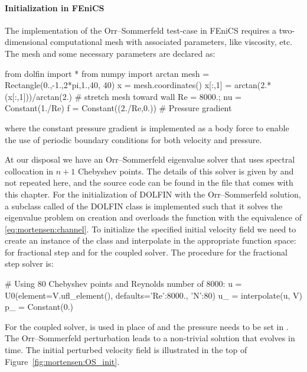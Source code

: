 \paragraph{Initialization in FEniCS}

The implementation of the Orr--Sommerfeld test-case in FEniCS requires
a two-dimensional computational mesh with associated parameters, like
viscosity, etc. The mesh and some necessary parameters are declared as:
\begin{python}
from dolfin import *
from numpy import arctan
mesh = Rectangle(0.,-1.,2*pi,1.,40, 40)
x = mesh.coordinates()
x[:,1] = arctan(2.*(x[:,1]))/arctan(2.)  # stretch mesh toward wall
Re = 8000.; nu = Constant(1./Re)
f = Constant((2./Re,0.)) # Pressure gradient
\end{python}
where the constant pressure gradient is implemented as a body force
to enable the use of periodic boundary conditions for both velocity
and pressure.

At our disposal we have an Orr--Sommerfeld eigenvalue solver that uses
spectral collocation in $n+1$ Chebyshev points. The details of this
solver is given by \citet{Trefethen2006} and not repeated here, and the
source code can be found in the file  that
comes with this chapter. For the initialization of DOLFIN 
with the Orr--Sommerfeld solution, a subclass called  of the
DOLFIN class  is implemented such that it solves the
eigenvalue problem on creation and overloads the  function
with the equivalence of \eqref{eq:mortensen:channel}. To initialize the
specified initial velocity field we need to create an instance of the
 class and interpolate in the appropriate function space:
 for fractional step and  for the coupled solver. The
procedure for the fractional step solver is:
\begin{python}
# Using 80 Chebyshev points and Reynolds number of 8000:
u = U0(element=V.ufl_element(), defaults={'Re':8000., 'N':80})
u_ = interpolate(u, V)
p_ = Constant(0.)
\end{python}
For the coupled solver,  is used in place of 
and the pressure needs to be set in . The Orr--Sommerfeld
perturbation leads to a non-trivial solution that evolves in
time. The initial perturbed velocity field is illustrated in the top
of Figure~\ref{fig:mortensen:OS_init}.

